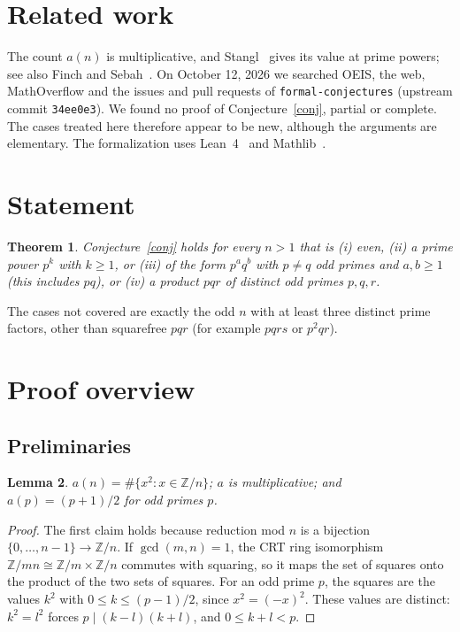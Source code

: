 \documentclass[11pt]{article}
\newtheorem{theorem}{Theorem}
\newtheorem{lemma}[theorem]{Lemma}
\theoremstyle{remark}\newtheorem{remark}[theorem]{Remark}
\begin{document}
\section{Related work}
The count $a(n)$ is multiplicative, and Stangl~\cite{stangl} gives its value at prime powers; see also Finch and Sebah~\cite{fs}. On October 12, 2026 we searched OEIS, the web, MathOverflow and the issues and pull requests of \texttt{formal-conjectures} (upstream commit \texttt{34ee0e3}). We found no proof of Conjecture~\ref{conj}, partial or complete. The cases treated here therefore appear to be new, although the arguments are elementary. The formalization uses Lean~4~\cite{lean4} and Mathlib~\cite{mathlib}.

\section{Statement}
\begin{theorem}\label{main}
Conjecture~\ref{conj} holds for every $n>1$ that is (i) even, (ii) a prime power $p^k$ with $k\ge1$, or (iii) of the form $p^aq^b$ with $p\ne q$ odd primes and $a,b\ge1$ (this includes $pq$), or (iv) a product $pqr$ of distinct odd primes $p,q,r$.
\end{theorem}
\noindent The cases not covered are exactly the odd $n$ with at least three distinct prime factors, other than squarefree $pqr$ (for example $pqrs$ or $p^2qr$).

\section{Proof overview}
\subsection{Preliminaries}
\begin{lemma}\label{mult}
$a(n)=\#\{x^2 : x\in\mathbb{Z}/n\}$; $a$ is multiplicative; and $a(p)=(p+1)/2$ for odd primes $p$.
\end{lemma}
\begin{proof}
The first claim holds because reduction mod $n$ is a bijection $\{0,\dots,n-1\}\to\mathbb{Z}/n$. If $\gcd(m,n)=1$, the CRT ring isomorphism $\mathbb{Z}/mn\cong \mathbb{Z}/m\times\mathbb{Z}/n$ commutes with squaring, so it maps the set of squares onto the product of the two sets of squares. For an odd prime $p$, the squares are the values $k^2$ with $0\le k\le (p-1)/2$, since $x^2=(-x)^2$. These values are distinct: $k^2=l^2$ forces $p\mid (k-l)(k+l)$, and $0\le k+l<p$.
\end{proof}
\end{document}
